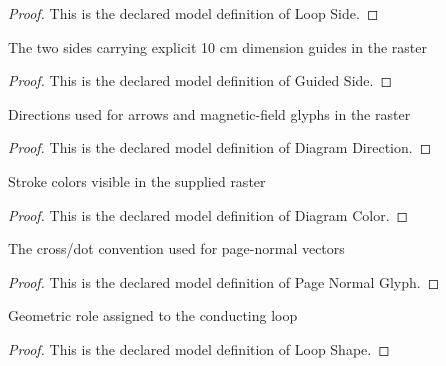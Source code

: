 \begin{proof}
  This is the declared model definition of Loop Side.
\end{proof}
\begin{definition}
  \label{def:physics:phyx-mini-0931:phyxminiproblems-problemphyxmini0931-guidedside}
  The two sides carrying explicit 10 cm dimension guides in the raster
\end{definition}
\begin{proof}
  This is the declared model definition of Guided Side.
\end{proof}
\begin{definition}
  \label{def:physics:phyx-mini-0931:phyxminiproblems-problemphyxmini0931-diagramdirection}
  Directions used for arrows and magnetic-field glyphs in the raster
\end{definition}
\begin{proof}
  This is the declared model definition of Diagram Direction.
\end{proof}
\begin{definition}
  \label{def:physics:phyx-mini-0931:phyxminiproblems-problemphyxmini0931-diagramcolor}
  Stroke colors visible in the supplied raster
\end{definition}
\begin{proof}
  This is the declared model definition of Diagram Color.
\end{proof}
\begin{definition}
  \label{def:physics:phyx-mini-0931:phyxminiproblems-problemphyxmini0931-pagenormalglyph}
  The cross/dot convention used for page-normal vectors
\end{definition}
\begin{proof}
  This is the declared model definition of Page Normal Glyph.
\end{proof}
\begin{definition}
  \label{def:physics:phyx-mini-0931:phyxminiproblems-problemphyxmini0931-loopshape}
  Geometric role assigned to the conducting loop
\end{definition}
\begin{proof}
  This is the declared model definition of Loop Shape.
\end{proof}
